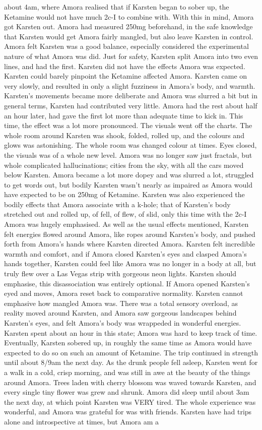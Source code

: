 \documentclass[12pt]{book}
\begin{document}
about 4am, where Amora realised that if Karsten began to sober up, the Ketamine would not have much 2c-I to combine with. With this in mind, Amora got Karsten out. Amora had measured 250mg beforehand, in the safe knowledge that Karsten would get Amora fairly mangled, but also leave Karsten in control. Amora felt Karsten was a good balance, especially considered the experimental nature of what Amora was did. Just for safety, Karsten split Amora into two even lines, and had the first. Karsten did not have the effects Amora was expected. Karsten could barely pinpoint the Ketamine affected Amora. Karsten came on very slowly, and resulted in only a slight fuzziness in Amora's body, and warmth. Karsten's movements became more deliberate and Amora was slurred a bit but in general terms, Karsten had contributed very little. Amora had the rest about half an hour later, had gave the first lot more than adequate time to kick in. This time, the effect was a lot more pronounced. The visuals went off the charts. The whole room around Karsten was shook, folded, rolled up, and the colours and glows was astonishing. The whole room was changed colour at times. Eyes closed, the visuals was of a whole new level. Amora was no longer saw just fractals, but whole complicated hallucinations; cities from the sky, with all the cars moved below Karsten. Amora became a lot more dopey and was slurred a lot, struggled to get words out, but bodily Karsten wasn't nearly as impaired as Amora would have expected to be on 250mg of Ketamine. Karsten was also experienced the bodily effects that Amora associate with a k-hole; that of Karsten's body stretched out and rolled up, of fell, of flew, of slid, only this time with the 2c-I Amora was hugely emphasised. As well as the usual effects mentioned, Karsten felt energies flowed around Amora, like ropes around Karsten's body, and pushed forth from Amora's hands where Karsten directed Amora. Karsten felt incredible warmth and comfort, and if Amora closed Karsten's eyes and clasped Amora's hands together, Karsten could feel like Amora was no longer in a body at all, but truly flew over a Las Vegas strip with gorgeous neon lights. Karsten should emphasise, this disassociation was entirely optional. If Amora opened Karsten's eyed and moves, Amora reset back to comparative normality. Karsten cannot emphasive how mangled Amora was. There was a total sensory overload, as reality moved around Karsten, and Amora saw gorgeous landscapes behind Karsten's eyes, and felt Amora's body was wrappeded in wonderful energies. Karsten spent about an hour in this state; Amora was hard to keep track of time. Eventually, Karsten sobered up, in roughly the same time as Amora would have expected to do so on such an amount of Ketamine. The trip continued in strength until about 8/9am the next day. As the drunk people fell asleep, Karsten went for a walk in a cold, crisp morning, and was still in awe at the beauty of the things around Amora. Trees laden with cherry blossom was waved towards Karsten, and every single tiny flower was grew and shrunk. Amora did sleep until about 3am the next day, at which point Karsten was VERY tired. The whole experience was wonderful, and Amora was grateful for was with friends. Karsten have had trips alone and introspective at times, but Amora am a 
\end{document}
